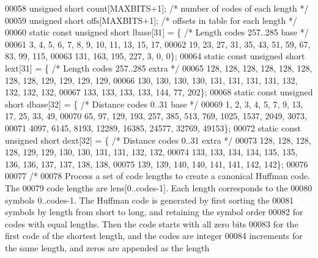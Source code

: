 \begin{DoxyCode}
00058     \textcolor{keywordtype}{unsigned} \textcolor{keywordtype}{short} count[MAXBITS+1];    \textcolor{comment}{/* number of codes of each length */}
00059     \textcolor{keywordtype}{unsigned} \textcolor{keywordtype}{short} offs[MAXBITS+1];     \textcolor{comment}{/* offsets in table for each length */}
00060     \textcolor{keyword}{static} \textcolor{keyword}{const} \textcolor{keywordtype}{unsigned} \textcolor{keywordtype}{short} lbase[31] = \{ \textcolor{comment}{/* Length codes 257..285 base */}
00061         3, 4, 5, 6, 7, 8, 9, 10, 11, 13, 15, 17,
00062         19, 23, 27, 31, 35, 43, 51, 59, 67, 83, 99, 115,
00063         131, 163, 195, 227, 3, 0, 0\};
00064     \textcolor{keyword}{static} \textcolor{keyword}{const} \textcolor{keywordtype}{unsigned} \textcolor{keywordtype}{short} lext[31] = \{ \textcolor{comment}{/* Length codes 257..285 extra */}
00065         128, 128, 128, 128, 128, 128, 128, 128, 129, 129, 129, 129,
00066         130, 130, 130, 130, 131, 131, 131, 131, 132, 132, 132, 132,
00067         133, 133, 133, 133, 144, 77, 202\};
00068     \textcolor{keyword}{static} \textcolor{keyword}{const} \textcolor{keywordtype}{unsigned} \textcolor{keywordtype}{short} dbase[32] = \{ \textcolor{comment}{/* Distance codes 0..31 base */}
00069         1, 2, 3, 4, 5, 7, 9, 13, 17, 25, 33, 49,
00070         65, 97, 129, 193, 257, 385, 513, 769, 1025, 1537, 2049, 3073,
00071         4097, 6145, 8193, 12289, 16385, 24577, 32769, 49153\};
00072     \textcolor{keyword}{static} \textcolor{keyword}{const} \textcolor{keywordtype}{unsigned} \textcolor{keywordtype}{short} dext[32] = \{ \textcolor{comment}{/* Distance codes 0..31 extra */}
00073         128, 128, 128, 128, 129, 129, 130, 130, 131, 131, 132, 132,
00074         133, 133, 134, 134, 135, 135, 136, 136, 137, 137, 138, 138,
00075         139, 139, 140, 140, 141, 141, 142, 142\};
00076 
00077     \textcolor{comment}{/*}
00078 \textcolor{comment}{       Process a set of code lengths to create a canonical Huffman code.  The}
00079 \textcolor{comment}{       code lengths are lens[0..codes-1].  Each length corresponds to the}
00080 \textcolor{comment}{       symbols 0..codes-1.  The Huffman code is generated by first sorting the}
00081 \textcolor{comment}{       symbols by length from short to long, and retaining the symbol order}
00082 \textcolor{comment}{       for codes with equal lengths.  Then the code starts with all zero bits}
00083 \textcolor{comment}{       for the first code of the shortest length, and the codes are integer}
00084 \textcolor{comment}{       increments for the same length, and zeros are appended as the length}

\end{DoxyCode}
